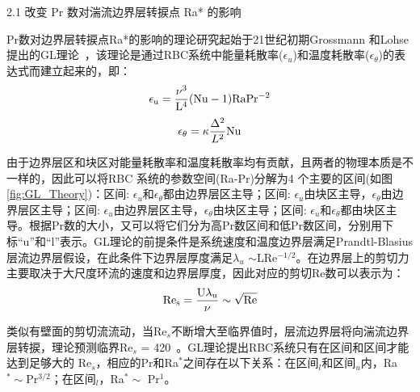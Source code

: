 \documentclass[10pt,aps]{article}
\def\be{\begin{equation}}
\def\ee{\end{equation}}
\begin{document}
{2.1 改变 Pr 数对湍流边界层转捩点 Ra* 的影响 


Pr数对边界层转捩点Ra*的影响的理论研究起始于21世纪初期Grossmann 和Lohse 提出的GL理论~\cite{GL00,GL01}，该理论是通过RBC系统中能量耗散率($\epsilon_u$)和温度耗散率($\epsilon_\theta$)的表达式而建立起来的，即：
\be
\rm \epsilon_u=\frac{\nu^{3}}{L^4}(\rm Nu-1)Ra Pr^{-2}
\ee
\be
\epsilon_\theta=\kappa \frac{\Delta^2}{L^2}\rm Nu
\ee
\vskip 6pt

由于边界层区和块区对能量耗散率和温度耗散率均有贡献，且两者的物理本质是不一样的，因此可以将RBC 系统的参数空间(Ra-Pr)分解为4 个主要的区间(如图\ref{fig:GL_Theory})：区间\uppercase\expandafter{}: $\epsilon_u$和$\epsilon_\theta$都由边界层区主导；区间\uppercase\expandafter{}: $\epsilon_u$由块区主导，$\epsilon_\theta$由边界层区主导；区间\uppercase\expandafter{}: $\epsilon_u$由边界层区主导，$\epsilon_\theta$由块区主导；区间\uppercase\expandafter{}: $\epsilon_u$和$\epsilon_\theta$都由块区主导。根据Pr数的大小，又可以将它们分为高Pr数区间和低Pr数区间，分别用下标``u”和``l”表示。GL理论的前提条件是系统速度和温度边界层满足Prandtl-Blasius层流边界层假设，在此条件下边界层厚度满足$\lambda_u$ $\sim $LRe$^{-1/2}$。在边界层上的剪切力主要取决于大尺度环流的速度和边界层厚度，因此对应的剪切Re数可以表示为：
\be
\rm Re_s=\frac{U\lambda_u}{\nu}\sim \sqrt{Re}
\ee
\vskip 6pt

类似有壁面的剪切流流动，当Re$_s$不断增大至临界值时，层流边界层将向湍流边界层转捩，理论预测临界Re$_s$ = 420~\cite{LL63}。GL理论提出RBC系统只有在区间\uppercase\expandafter{}和区间\uppercase\expandafter{}才能达到足够大的
Re$_s$，相应的Pr和Ra$^*$之间存在以下关系：在区间\uppercase\expandafter{}$_l$和区间\uppercase\expandafter{}$_u$内，Ra$^* \sim $Pr$^{3/2}$；在区间\uppercase\expandafter{}$_l$，Ra$^*\sim$ Pr$^1$。

}
\end{document}
